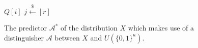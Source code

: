 \begin{figure}[t]
\begin{algorithm}[H]
    \caption{\label{alg.predictability-adversary}
    The predictor $\mathcal{A}^*$
    of the distribution $X$
    which makes use of a distinguisher $\mathcal{A}$ between
    $X$ and $U(\{0,1\}^\kappa)$.}
    \begin{algorithmic}[1]
            \State\Return$Q[i]$
        \EndFunction
                \State$j \stackrel{\$}{\gets} [r]$
            \Else
            \EndIf

                \State{}
            \EndIf
            \State{}
        \EndFunction
    \end{algorithmic}
\end{algorithm}
\end{figure}
